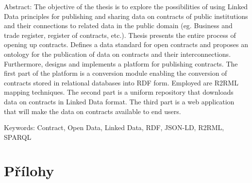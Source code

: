 \documentclass[12pt,a4paper]{report}
\let\openright=\clearpage
\def\chapwithtoc#1{
\chapter*{#1}
\addcontentsline{toc}{chapter}{#1}
}
\begin{document}
{Abstract:
The objective of the thesis is to explore the possibilities of using Linked Data principles for publishing and sharing data on contracts of public institutions and their connections to related data in the public domain (eg. Business and trade register, register of contracts, etc.). Thesis presents the entire process of opening up contracts. Defines a data standard for open contracts and proposes an ontology for the publication of data on contracts and their interconnections. Furthermore, designs and implements a platform for publishing contracts. The first part of the platform is a conversion module enabling the conversion of contracts stored in relational databases into RDF form. Employed are R2RML mapping techniques. The second part is a uniform repository that downloads data on contracts in Linked Data format. The third part is a web application that will make the data on contracts available to end users.

Keywords:
Contract, Open Data, Linked Data, RDF, JSON-LD, R2RML, SPARQL

\vss}

\newpage


\openright
\pagestyle{plain}
\setcounter{page}{1}
\tableofcontents











% 






\listoffigures
{}

\listoftables
{}

\lstlistoflistings
{}


\chapwithtoc{Přílohy}


\openright
\end{document}
